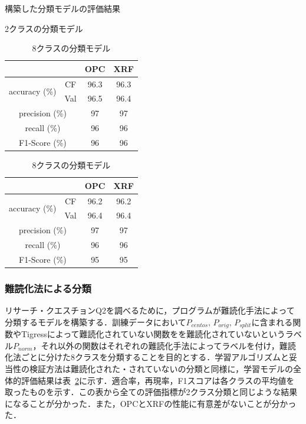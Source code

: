 \documentclass[12pt]{jarticle}
\newcommand\doubleRule{\toprule\toprule}
\begin{document}
\begin{table}[!htb]
    \caption{構築した分類モデルの評価結果}
    \begin{subtable}{.5\linewidth}
      \centering
\caption{2クラスの分類モデル}
\label{table:binclass}
\begin{tabular}[t]{cc|c|c}
\doubleRule
&  & OPC & XRF \\
\hline
\multirow{2}{*}{accuracy (\%)} & \multicolumn{1}{|c|}{CF} & 96.3 & 96.3 \\\cline{2-4}
& \multicolumn{1}{|c|}{Val} & 96.5 & 96.4 \\
\hline
\multicolumn{2}{c|}{precision (\%)} & 97 & 97 \\
\hline
\multicolumn{2}{c|}{recall (\%)} & 96 & 96 \\
\hline
\multicolumn{2}{c|}{F1-Score (\%)} & 96 & 96 \\
\bottomrule
\end{tabular}
    \end{subtable}
    \begin{subtable}{.5\linewidth}
      \centering
\caption{8クラスの分類モデル}
\label{table:allclass}
\begin{tabular}[t]{cc|c|c}
\doubleRule
&  & OPC & XRF \\
\hline
\multirow{2}{*}{accuracy (\%)} & \multicolumn{1}{|c|}{CF} & 96.2 & 96.2 \\\cline{2-4}
& \multicolumn{1}{|c|}{Val} & 96.4 & 96.4 \\
\hline
\multicolumn{2}{c|}{precision (\%)} & 97 & 97 \\
\hline
\multicolumn{2}{c|}{recall (\%)} & 96 & 96 \\
\hline
\multicolumn{2}{c|}{F1-Score (\%)} & 95 & 95 \\
\bottomrule
\end{tabular}
    \end{subtable} 
\end{table}

\subsubsection*{難読化法による分類}
リサーチ・クエスチョンQ2を調べるために，プログラムが難読化手法によって分類するモデルを構築する．訓練データにおいて$P_{centos},\,P_{orig},\,P_{split}$に含まれる関数やTigressによって難読化されていない関数をを難読化されていないというラベル$P_{norm}$，それ以外の関数はそれぞれの難読化手法によってラベルを付け，難読化法ごとに分けた8クラスを分類することを目的とする．学習アルゴリズムと妥当性の検証方法は難読化された・されていないの分類と同様に，学習モデルの全体的評価結果は表~\ref{table:allclass}に示す．適合率，再現率，F1スコアは各クラスの平均値を取ったものを示す．この表から全ての評価指標が2クラス分類と同じような結果になることが分かった．また，OPCとXRFの性能に有意差がないことが分かった．
\end{document}
